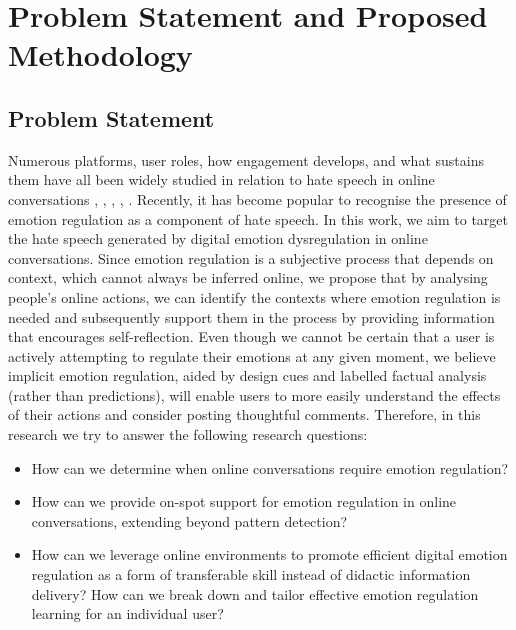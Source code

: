 \documentclass[acmtog]{acmart}
\begin{document}
\section{Problem Statement and Proposed Methodology}
\subsection{Problem Statement}
Numerous platforms, user roles, how engagement develops, and what sustains them have all been widely studied in relation to hate speech in online conversations \cite{solovev2022moral}, \cite{saveski2021structure}, \cite{majo2020volume}, \cite{guberman2016quantifying}, \cite{konikoff2021gatekeepers}. Recently, it has become popular to recognise the presence of emotion regulation as a component of hate speech. In this work, we aim to target the hate speech generated by digital emotion dysregulation in online conversations. Since emotion regulation is a subjective process that depends on context, which cannot always be inferred online, we propose that by analysing people's online actions, we can identify the contexts where emotion regulation is needed and subsequently support them in the process by providing information that encourages self-reflection. Even though we cannot be certain that a user is actively attempting to regulate their emotions at any given moment, we believe implicit emotion regulation, aided by design cues and labelled factual analysis (rather than predictions), will enable users to more easily understand the effects of their actions and consider posting thoughtful comments. Therefore, in this research we try to answer the following research questions:
\begin{itemize}
    \item How can we determine when online conversations require emotion regulation?
    \item How can we provide on-spot support for emotion regulation in online conversations, extending beyond pattern detection?
    \item How can we leverage online environments to promote efficient digital emotion regulation as a form of transferable skill instead of didactic information delivery? How can we break down and tailor effective emotion regulation learning for an individual user?
\end{itemize}



\end{document}

